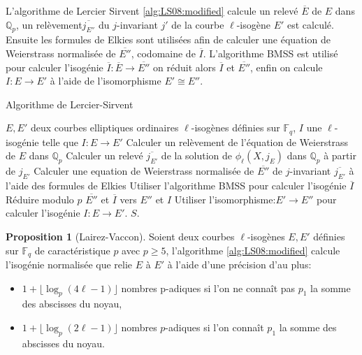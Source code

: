 \documentclass[10pt,a4paper]{book}
\theoremstyle{plain}
\theoremstyle{definition}
\theoremstyle{definition}
\theoremstyle{definition}
\newtheorem{prop}[thm]{Proposition}
\theoremstyle{definition}
\theoremstyle{remark}
\theoremstyle{remark}
\begin{document}
L'algorithme de Lercier Sirvent \ref{alg:LS08:modified} calcule un relevé $\overline{E}$ de $E$ dans $\mathbb{Q}_p$, un relèvement$\overline{j_{E''}}$ du $j$-invariant $j'$ de la courbe $\ell$-isogène $E'$ est calculé. Ensuite les formules de Elkies \cite{elkies1998} sont utilisées afin  de calculer une équation de Weierstrass normalisée de $\overline{E''}$, codomaine de $\overline{I}$. L'algorithme BMSS \cite{BMSS08} est utilisé pour calculer l'isogénie $\overline{I}:\overline{E} \rightarrow \overline{E''}$ on réduit alors $\overline{I}$ et $\overline{E''}$, enfin on calcule $I: E \rightarrow E' $ à l'aide de l'isomorphisme $E' \cong E''$. 

\begin{algorithm}
\caption{\label{alg:LS08:modified} Algorithme de Lercier-Sirvent}
\begin{algorithmic}[1]
\REQUIRE $E,E'$ deux courbes elliptiques ordinaires $\ell$-isogènes définies sur $\mathbb{F}_q$,%
\ENSURE $I$ une $\ell$-isogénie telle que $I:E \rightarrow E'$
\STATE Calculer un relèvement de l'équation de Weierstrass de $E$ dans $\mathbb{Q}_p$
\STATE Calculer un relevé $\overline{j_{E'}}$ de la solution de $\phi_{\ell}(X,j_E)$ dans $\mathbb{Q}_p$ à partir de $j_{E'}$
\STATE Calculer une equation de Weierstrass normalisée de $\overline{E''}$ de $j$-invariant $\overline{j_{E'}}$ à l'aide des formules de Elkies
\STATE Utiliser l'algorithme BMSS pour calculer l'isogénie $\overline{I}$
\STATE Réduire modulo $p$ $\overline{E''}$ et $\overline{I}$ vers $E''$ et $I$
\STATE Utiliser l'isomorphisme:$E' \rightarrow E''$ pour calculer l'isogénie $I: E \rightarrow E'$.
\RETURN$S$. 
\end{algorithmic}
\end{algorithm}

\begin{prop}[Lairez-Vaccon]
Soient deux courbes $\ell$-isogènes $E,E'$ définies sur $\mathbb{F}_q$ de caractéristique $p$ avec $p \geqslant 5$, l'algorithme \ref{alg:LS08:modified} calcule l'isogénie normalisée que relie $E$ à $E'$ à l'aide d'une précision d'au plus: 
\begin{itemize}
\item $ 1 + \lfloor \log_p(4 \ell - 1) \rfloor $ nombres p-adiques si l'on ne connaît pas $p_1$ la somme des abscisses du noyau,
\item  $ 1 + \lfloor \log_p(2 \ell - 1) \rfloor $ nombres $p$-adiques si l'on connaît $p_1$ la somme des abscisses du noyau.
\end{itemize}
\end{prop}
\end{document}
